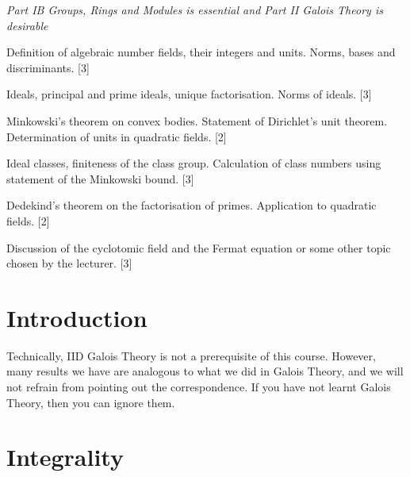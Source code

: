 \documentclass[a4paper]{article}
\begin{document}
\maketitle
{\small
\noindent\emph{Part IB Groups, Rings and Modules is essential and Part II Galois Theory is desirable}
\vspace{10pt}

\noindent Definition of algebraic number fields, their integers and units. Norms, bases and discriminants.\hspace*{\fill} [3]

\vspace{5pt}
\noindent Ideals, principal and prime ideals, unique factorisation. Norms of ideals.\hspace*{\fill} [3]

\vspace{5pt}
\noindent Minkowski's theorem on convex bodies. Statement of Dirichlet's unit theorem. Determination of units in quadratic fields.\hspace*{\fill} [2]

\vspace{5pt}
\noindent Ideal classes, finiteness of the class group. Calculation of class numbers using statement of the Minkowski bound.\hspace*{\fill} [3]

\vspace{5pt}
\noindent Dedekind's theorem on the factorisation of primes. Application to quadratic fields.\hspace*{\fill} [2]

\vspace{5pt}
\noindent Discussion of the cyclotomic field and the Fermat equation or some other topic chosen by the lecturer.\hspace*{\fill} [3]}

\tableofcontents
\setcounter{section}{-1}
\section{Introduction}
Technically, IID Galois Theory is not a prerequisite of this course. However, many results we have are analogous to what we did in Galois Theory, and we will not refrain from pointing out the correspondence. If you have not learnt Galois Theory, then you can ignore them.

\section{Integrality}
\end{document}
